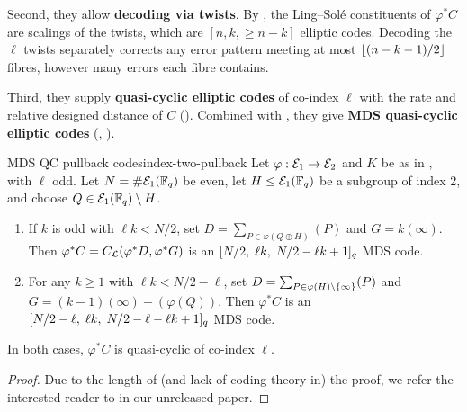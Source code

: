 \documentclass[twocolumn, 11pt]{scrartcl}
\begin{document}
Second, they allow \textbf{decoding via twists}. By , the Ling--Sol\'e constituents \cite{ling2001algebraic} of $\varphi^*C$ are scalings of the twists, which are $[n,k,\geq n-k]$ elliptic codes. Decoding the $\ell$ twists separately corrects any error pattern meeting at most $\lfloor(n-k-1)/2\rfloor$ fibres, however many errors each fibre contains.

Third, they supply \textbf{quasi-cyclic elliptic codes} of co-index $\ell$ with the rate and relative designed distance of $C$ (). Combined with , they give \textbf{MDS quasi-cyclic elliptic codes} (, ).

\begin{construction}{MDS QC pullback codes}{index-two-pullback}
    Let $\varphi:\mathcal{E}_1\to\mathcal{E}_2$ and $K$ be as in , with $\ell$ odd. Let $N=\#\mathcal{E}_1(\mathbb{F}_q)$ be even, let $H\leq\mathcal{E}_1(\mathbb{F}_q)$ be a subgroup of index 2, and choose $Q\in\mathcal{E}_1(\mathbb{F}_q)\setminus H$.
    \begin{enumerate}
        \item \label{enum:index-two-pullback-odd} If $k$ is odd with $\ell k<N/2$, set $D=\sum_{P\in\varphi(Q\oplus H)}(P)$ and $G=k(\infty)$. Then $\varphi^*C=C_\mathcal{L}(\varphi^*D,\varphi^*G)$ is an $[N/2,\;\ell k,\;N/2-\ell k+1]_q$ MDS code.
        \item \label{enum:index-two-pullback-any} For any $k\geq1$ with $\ell k<N/2-\ell$, set $D=\sum_{P\in\varphi(H)\setminus\{\infty\}}(P)$ and $G=(k-1)(\infty)+(\varphi(Q))$. Then $\varphi^*C$ is an $[N/2-\ell,\;\ell k,\;N/2-\ell-\ell k+1]_q$ MDS code.
    \end{enumerate}
    In both cases, $\varphi^*C$ is quasi-cyclic of co-index $\ell$.
\end{construction}

\begin{proof}
    Due to the length of (and lack of coding theory in) the proof, we refer the interested reader to \cite[Constr.~18]{upcoming-paper} in our unreleased paper.
\end{proof}
\end{document}

